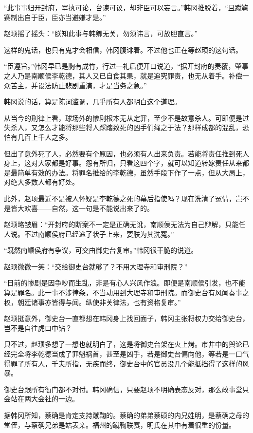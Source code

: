 “此事事归开封府，宰执可论，台谏可议，却非臣可以妄言。”韩冈推脱着，“且蹴鞠赛制出自于臣，臣亦当避嫌才是。”

赵顼摇了摇头：“朕知此事与韩卿无关，勿须讳言，可放胆直言。”

这样的鬼话，也只有鬼才会相信，韩冈腹诽着。不过他也正在等赵顼的这句话。

“臣遵旨。”韩冈早已是胸有成竹，行过一礼后便开口说道，“据开封府的奏覆，肇事之人乃是南顺侯李乾德，其人又已自食其果，就是追究罪责，也无从着手。补偿一众苦主，并设法防止悲剧重演，才是当务之急。”

韩冈说的话，算是陈词滥调，几乎所有人都明白这个道理。

从当今的刑律上看，球场外的惨剧根本无从定罪，至少不是故意杀人。可即便是过失杀人，又怎么才能将那些将人踩踏致死的凶手们绳之于法？那样成都的混乱，恐怕有几百上千人之多。

但出了意外死了人，必然要有个原因，也必须有人出来负责。若能将责任推到死人身上，这对大家都是好事。怨有所归，只看这四个字，就可以知道转嫁责任从来都是最简单有效的办法。将罪名推给的李乾德，虽然手段下作了一点，但从大局上，对绝大多数人都有好处。

此外，赵顼最近不是被人怀疑是李乾德之死的幕后指使吗？现在洗清了冤情，岂不是皆大欢喜——自然，这一句是不能说出来了的。

赵顼略皱眉：“开封府的断案不一定是正确无讹，南顺侯无法为自己辩解，只能任人说。不过南顺侯府已经递了状子上来，要朕为其洗冤。”

“既然南顺侯府有争议，可交由御史台复审。”韩冈很干脆的说道。

赵顼微微一笑：“交给御史台就够了？不用大理寺和审刑院？”

“日前的惨剧是因争吵而生乱，非是有心人兴风作浪。即便是南顺侯引发，也不能算是罪名。此一事不涉律条，不当动用到大理寺和审刑院。而御史台有风闻奏事之权，朝廷诸事亦皆得与闻。纵使非关律法，也有资格复审。”

赵顼挺意外，御史台一直都想在韩冈身上找回面子，韩冈主张将权力交给御史台，岂不是自往虎口中钻？

只不过，赵顼多想了一想也就明白了，这是将御史台架在火上烤。市井中的舆论已经完全将李乾德当成了罪魁祸首，甚至是凶手，若是御史台偏向他，等若是一口气得罪了所有人，千夫所指，无疾而终，御史台中的官员没几个能抵挡得了这样的风暴。

御史台跟所有衙门都不对付。韩冈确信，只要赵顼不明确表态反对，那么政事堂只会站在两大会社的一边。

据韩冈所知，蔡确是肯定支持蹴鞠的。蔡确的弟弟蔡硕的内兄姓明，是蔡确之母的堂侄，与蔡确兄弟是姑表亲。福州的蹴鞠联赛，明氏在其中有着很重的份量。

